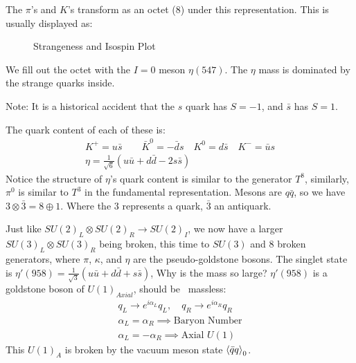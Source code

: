 The $\pi$'s and $K$'s transform as an octet (8) under this representation. This is usually displayed as:
\begin{figure}[H]
  \centering
  \caption{Strangeness and Isospin Plot}
  \label{fig:strangeisospin}
\end{figure}
We fill out the octet with the $I=0$ meson $\eta(547)$. The $\eta$ mass is dominated by the strange quarks inside.

Note: It is a historical accident that the $s$ quark has $S=-1$, and $\bar{s}$ has $S=1$.

The quark content of each of these is:
\begin{gather*}
  K^+=u\bar{s}\qquad \bar{K}^0=-\bar{d}s\quad K^0=d\bar{s}\quad K^-=\bar{u}s\\
  \eta=\frac1{\sqrt{6}}(u\bar{u}+d\bar{d}-2s\bar{s})
\end{gather*}
Notice the structure of $\eta$'s quark content is similar to the generator $T^8$, similarly, $\pi^0$ is similar to $T^3$ in the fundamental representation. Mesons are $q\bar{q}$, so we have $3\otimes\bar{3}=8\oplus1$. Where the $3$ represents a quark, $\bar{3}$ an antiquark.

Just like $SU(2)_L\otimes SU(2)_R\to SU(2)_I$, we now have a larger $SU(3)_L\otimes SU(3)_R$ being broken, this time to $SU(3)$ and 8 broken generators, where $\pi$, $\kappa$, and $\eta$ are the pseudo-goldstone bosons.
The singlet state is $\eta'(958)=\frac1{\sqrt{3}}(u\bar{u}+d\bar{d}+s\bar{s})$, Why is the mass so large? $\eta'(958)$ is a goldstone boson of $U(1)_{Axial}$, should be ~massless:
\begin{align*}
  q_L\to e^{i\alpha_L}q_L,\quad q_R\to e^{i\alpha_R}q_R\\
  \alpha_L=\alpha_R\implies \text{Baryon Number}\\
  \alpha_L=-\alpha_R\implies \text{Axial $U(1)$}
\end{align*}
This $U(1)_A$ is broken by the vacuum meson state $\ev{\bar{q}q}_0$.

